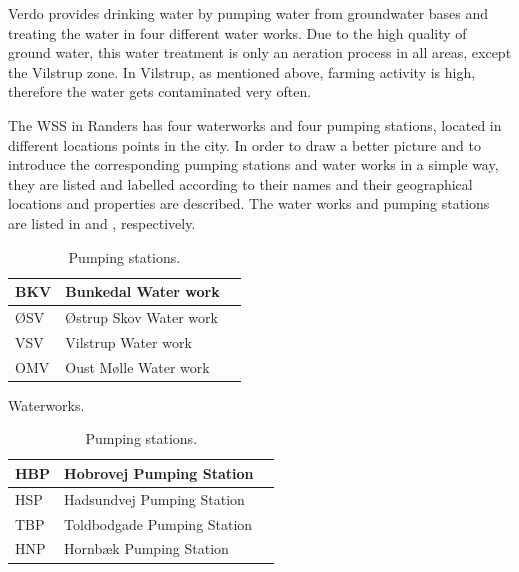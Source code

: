 Verdo provides drinking water by pumping water from groundwater bases and treating the water in four different water works. Due to the high quality of ground water, this water treatment is only an aeration process in all areas, except the Vilstrup zone. In Vilstrup, as mentioned above, farming activity is high, therefore the water gets contaminated very often. 

The WSS in Randers has four waterworks and four pumping stations, located in different locations points in the city. In order to draw a better picture and to introduce the corresponding pumping stations and water works in a simple way, they are listed and labelled according to their names and their geographical locations and properties are described. The water works and pumping stations are listed in  and , respectively.

\begin{table}[!htp]
\begin{subtable}{.52\linewidth}
\begin{center}
    \begin{tabular}{| l | l | l |}
    \hline
    BKV & Bunkedal Water work   \\ \hline
    ØSV & Østrup Skov Water work  \\ \hline
    VSV & Vilstrup Water work  \\ \hline
    OMV & Oust Mølle Water work   \\
    \hline
    \end{tabular}
\end{center}
\vspace{-3mm}
\caption{Waterworks.}
\label{waterworks_tab}
\end{subtable}
\begin{subtable}{.4\linewidth}
\begin{center}
    \begin{tabular}{| l | l | l |}
    \hline
    HBP & Hobrovej Pumping Station   \\ \hline
    HSP & Hadsundvej Pumping Station  \\ \hline
    TBP & Toldbodgade Pumping Station  \\ \hline
    HNP & Hornbæk Pumping Station   \\
    \hline
    \end{tabular}
    \end{center}
\vspace{-3mm}
\caption{Pumping stations.}
\label{pumpingstations_tab}
\end{subtable}
\end{table}
\vspace{-3mm}

